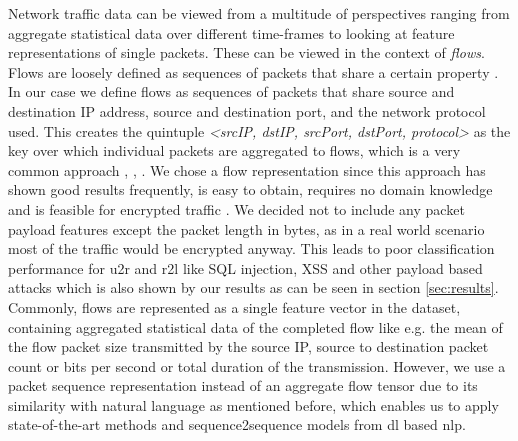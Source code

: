 Network traffic data can be viewed from a multitude of perspectives ranging from aggregate statistical data over different time-frames \cite{kitsune} to looking at feature representations of single packets. These can be viewed in the context of \textit{flows}.
Flows are loosely defined as sequences of packets that share a certain property \cite{adversarial_recurrent_ids}. In our case we define flows as sequences of packets that share source and destination IP address, source and destination port, and the network protocol used. This creates the quintuple \textit{<srcIP, dstIP, srcPort, dstPort, protocol>} as the key over which individual packets are aggregated to flows, which is a very common approach \cite{caia_vector}, \cite{unsw_nb15}, \cite{feature_vectors}. We chose a flow representation since this approach has shown good results frequently, is easy to obtain, requires no domain knowledge and is feasible for encrypted traffic \cite{feature_vectors}. We decided not to include any packet payload features except the packet length in bytes, as in a real world scenario most of the traffic would be encrypted anyway. This leads to poor classification performance for \gls{u2r} and \gls{r2l} \cite{nsl_kdd} like SQL injection, XSS and other payload based attacks which is also shown by our results as can be seen in section \ref{sec:results}. Commonly, flows are represented as a single feature vector in the dataset, containing aggregated statistical data of the completed flow like e.g. the mean of the flow packet size transmitted by the source IP, source to destination packet count or bits per second or total duration of the transmission. However, we use a packet sequence representation instead of an aggregate flow tensor due to its similarity with natural language as mentioned before, which enables us to apply state-of-the-art methods and sequence2sequence models from \gls{dl} based \gls{nlp}. 


